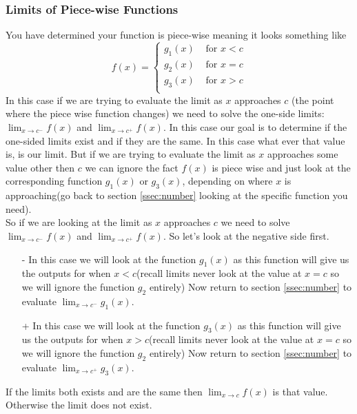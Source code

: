 \documentclass[12pt]{article}
\begin{document}
\subsubsection{Limits of Piece-wise Functions}
\label{ssec:pw-number}
 You have determined your function is piece-wise meaning it looks something like 
 $$f(x)=\begin{cases}
     g_1(x) & \text{ for } x<c\\
     g_2(x) & \text{ for } x=c\\
     g_3(x) & \text{ for } x>c\\
 \end{cases}$$
In this case if we are trying to evaluate the limit as $x$ approaches $c$ (the point where the piece wise function changes) we need to solve the one-side limits: $\displaystyle{\lim_{x\to c^-}f(x)}$ and $\displaystyle{\lim_{x\to c^+}f(x)}$. In this case our goal is to determine if the one-sided limits exist and if they are the same. In this case what ever that value is, is our limit. But if we are trying to evaluate the limit as $x$ approaches some value other then $c$ we can ignore the fact $f(x)$ is piece wise and just look at the corresponding function $g_1(x)$ or $g_3(x)$, depending on where $x$ is approaching(go back to section \ref{ssec:number} looking at the specific function you need).\\

So if we are looking at the limit as $x$ approaches $c$ we need to solve $\displaystyle{\lim_{x\to c^-}f(x)}$ and $\displaystyle{\lim_{x\to c^+}f(x)}$. So let's look at the negative side first.

\begin{itemize}
    \item[-] In this case we will look at the function $g_1(x)$ as this function will give us the outputs for when $x< c$(recall limits never look at the value at $x=c$ so we will ignore the function $g_2$ entirely) Now return to section \ref{ssec:number} to evaluate $\displaystyle{\lim_{x\to c^-}g_1(x)}$.\\

    \item[+] In this case we will look at the function $g_3(x)$ as this function will give us the outputs for when $x> c$(recall limits never look at the value at $x=c$ so we will ignore the function $g_2$ entirely) Now return to section \ref{ssec:number} to evaluate $\displaystyle{\lim_{x\to c^+}g_3(x)}$.\\
\end{itemize}
If the limits both exists and are the same then $\displaystyle{\lim_{x\to c}f(x)}$ is that value. Otherwise the limit does not exist.
\end{document}
